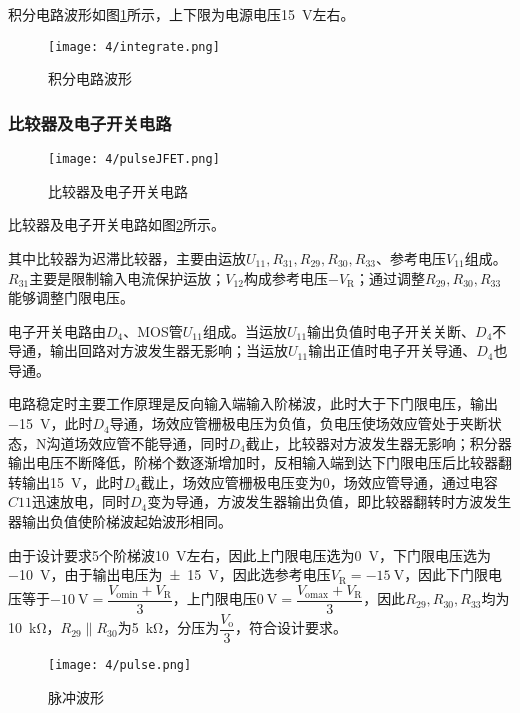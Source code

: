 积分电路波形如图\ref{fig:积分电路波形}所示，上下限为电源电压\SI{15}{\V}左右。

\begin{figure}[H]
	\centering
	\texttt{[image: 4/integrate.png]}
	\caption{积分电路波形}
	\label{fig:积分电路波形}
\end{figure}

\subsubsection{比较器及电子开关电路}%
\label{ssub:比较器及电子开关电路}

\begin{figure}[H]
	\centering
	\texttt{[image: 4/pulseJFET.png]}
	\caption{比较器及电子开关电路}
	\label{fig:比较器及电子开关电路}
\end{figure}

比较器及电子开关电路如图\ref{fig:比较器及电子开关电路}所示。

其中比较器为迟滞比较器，主要由运放$ U_{11}, R_{31}, R_{29}, R_{30}, R_{33} $、参考电压$ V_{11} $组成。$ R_{31} $主要是限制输入电流保护运放；$ V_{12} $构成参考电压$ -V_\mathrm{R} $；通过调整$ R_{29}, R_{30}, R_{33} $能够调整门限电压。

电子开关电路由$ D_4 $、MOS管$ U_{11} $组成。当运放$ U_{11} $输出负值时电子开关关断、$ D_4 $不导通，输出回路对方波发生器无影响；当运放$ U_{11} $输出正值时电子开关导通、$ D_4 $也导通。

电路稳定时主要工作原理是反向输入端输入阶梯波，此时大于下门限电压，输出\SI{-15}{\V}，此时$ D_4 $导通，场效应管栅极电压为负值，负电压使场效应管处于夹断状态，N沟道场效应管不能导通，同时$ D_4 $截止，比较器对方波发生器无影响；积分器输出电压不断降低，阶梯个数逐渐增加时，反相输入端到达下门限电压后比较器翻转输出\SI{+15}{\V}，此时$ D_4 $截止，场效应管栅极电压变为0，场效应管导通，通过电容$ C11 $迅速放电，同时$ D_4 $变为导通，方波发生器输出负值，即比较器翻转时方波发生器输出负值使阶梯波起始波形相同。

由于设计要求5个阶梯波\SI{10}{\V}左右，因此上门限电压选为\SI{0}{\V}，下门限电压选为\SI{-10}{\V}，由于输出电压为\SI{+-15}{\V}，因此选参考电压$ V_\mathrm{R} = \SI{-15}{\V} $，因此下门限电压等于$ \SI{-10}{\V} = \dfrac{V_\mathrm{omin} + V_\mathrm{R}}{3} $，上门限电压$ \SI{0}{\V} = \dfrac{V_\mathrm{omax} + V_\mathrm{R}}{3} $，因此$ R_{29}, R_{30}, R_{33} $均为\SI{10}{\kohm}，$ R_{29}\parallel R_{30} $为\SI{5}{\kohm}，分压为$ \dfrac{V_\mathrm{o}}{3} $，符合设计要求。

\begin{figure}[H]
	\centering
	\texttt{[image: 4/pulse.png]}
	\caption{脉冲波形}
	\label{fig:脉冲波形}
\end{figure}

